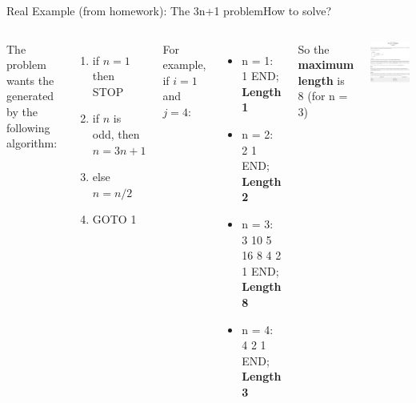 \begin{frame}{Real Example (from homework): The 3n+1 problem}{How to solve?}
  \begin{columns}
    {\smaller
    The problem wants the  generated by the following algorithm:
      \begin{enumerate}
        \item if $n = 1$ then STOP
        \item if $n$ is odd, then $n = 3n + 1$
        \item else $n = n/2$
        \item GOTO 1
      \end{enumerate}
    \medskip

    For example, if $i = 1$ and $j = 4$:
    \begin{itemize}
      \item n = 1: 1 END; {\bf Length 1}
      \item n = 2: 2 1 END; {\bf Length 2}
      \item n = 3: 3 10 5 16 8 4 2 1 END; {\bf Length 8}
      \item n = 4: 4 2 1 END; {\bf Length 3}
    \end{itemize}
    So the {\bf maximum length} is 8 (for n = 3)}
    \includegraphics[width=1\textwidth]{img/3n_problem}
  \end{columns}
\end{frame}

